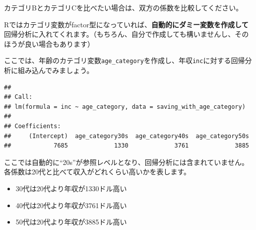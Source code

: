 \documentclass[]{book}
\newenvironment{Shaded}{\begin{snugshade}}{\end{snugshade}}
\newcommand{\KeywordTok}[1]{\textcolor[rgb]{0.13,0.29,0.53}{\textbf{#1}}}
\newcommand{\DataTypeTok}[1]{\textcolor[rgb]{0.13,0.29,0.53}{#1}}
\newcommand{\DecValTok}[1]{\textcolor[rgb]{0.00,0.00,0.81}{#1}}
\newcommand{\StringTok}[1]{\textcolor[rgb]{0.31,0.60,0.02}{#1}}
\newcommand{\OperatorTok}[1]{\textcolor[rgb]{0.81,0.36,0.00}{\textbf{#1}}}
\newcommand{\NormalTok}[1]{#1}
\providecommand{\tightlist}{%
  \setlength{\itemsep}{0pt}\setlength{\parskip}{0pt}}
\begin{document}
カテゴリBとカテゴリCを比べたい場合は、双方の係数を比較してください。

Rではカテゴリ変数がfactor型になっていれば、\textbf{自動的にダミー変数を作成して}回帰分析に入れてくれます。（もちろん、自分で作成しても構いませんし、そのほうが良い場合もあります）

ここでは、年齢のカテゴリ変数\texttt{age\_category}を作成し、年収\texttt{inc}に対する回帰分析に組み込んでみましょう。

\begin{Shaded}
\end{Shaded}

\begin{verbatim}
## 
## Call:
## lm(formula = inc ~ age_category, data = saving_with_age_category)
## 
## Coefficients:
##     (Intercept)  age_category30s  age_category40s  age_category50s  
##            7685             1330             3761             3885
\end{verbatim}

ここでは自動的に``20s''が参照レベルとなり、回帰分析には含まれていません。
各係数は20代と比べて収入がどれくらい高いかを表します。

\begin{itemize}
\tightlist
\item
  30代は20代より年収が1330ドル高い
\item
  40代は20代より年収が3761ドル高い
\item
  50代は20代より年収が3885ドル高い
\end{itemize}
\end{document}
